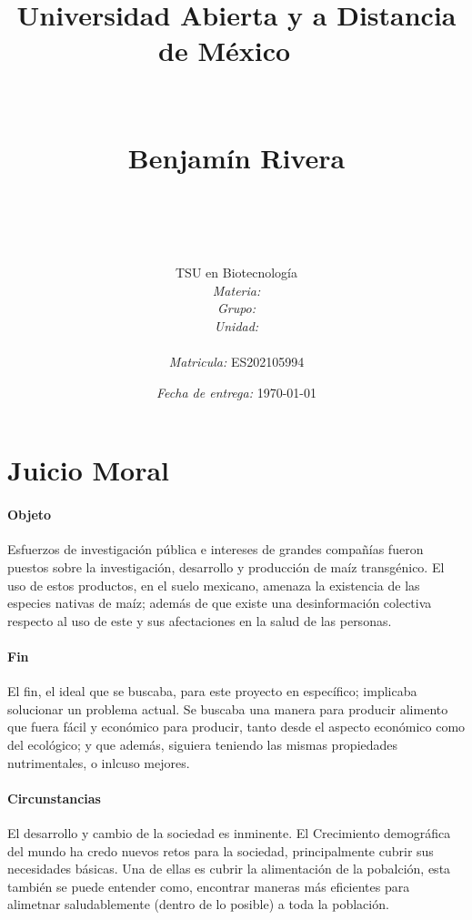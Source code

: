 \documentclass[12pt]{article}
\title{
	{\Huge Universidad Abierta y a Distancia de M\'exico}
	\ \\\ \\\ \\ {\Large Benjam\'in Rivera} \\
	\bf{\titulo}\\\ \\}
\author{
	TSU en Biotecnolog\'ia \\
	\textit{Materia:} \materia \\
	\textit{Grupo:} \grupo \\
	\textit{Unidad:} \unidad \\
	\\
	\textit{Matricula:} ES202105994 }
\date{\textit{Fecha de entrega:} \today}
\begin{document}
\maketitle\newpage

\section*{Juicio Moral}
	\paragraph*{Objeto}
		
		\par Esfuerzos de investigación pública e intereses de grandes compañías fueron puestos sobre la investigación, desarrollo y producción de maíz transgénico. El uso de estos productos, en el suelo mexicano, amenaza la existencia de las especies nativas de maíz; además de que existe una desinformación colectiva respecto al uso de este y sus afectaciones en la salud de las personas.

	\paragraph*{Fin}
		
		\par El fin, el ideal que se buscaba, para este proyecto en espec\'ifico; implicaba solucionar un problema actual. Se buscaba una manera para producir alimento que fuera f\'acil y econ\'omico para producir, tanto desde el aspecto econ\'omico como del ecol\'ogico; y que adem\'as, siguiera teniendo las mismas propiedades nutrimentales, o inlcuso mejores.


	\paragraph*{Circunstancias}

		\par El desarrollo y cambio de la sociedad es inminente. El Crecimiento demogr\'afica del mundo ha credo nuevos retos para la sociedad, principalmente cubrir sus necesidades b\'asicas. Una de ellas es cubrir la alimentaci\'on de la pobalci\'on, esta tambi\'en se puede entender como, encontrar maneras m\'as eficientes para alimetnar saludablemente (dentro de lo posible) a toda la poblaci\'on.
		
\end{document}
